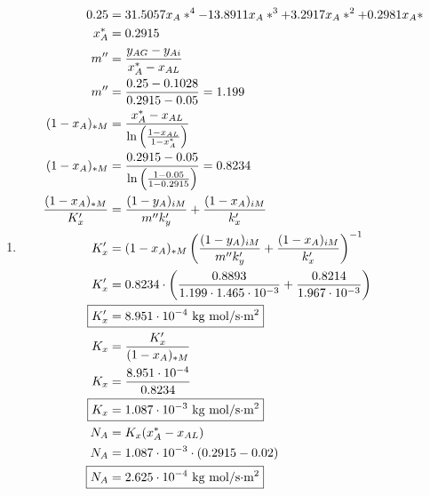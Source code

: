 \documentclass[12pt]{article}
\begin{document}
\begin{enumerate}
\begin{enumerate}
        \item 
        \begin{align*}
            0.25 &= 31.5057 x_A*^4 - 13.8911 x_A*^3 + 3.2917 x_A*^2 + 0.2981 x_A* \\ 
            x_A^* &= 0.2915 \\
            m'' &= \frac{y_{AG} - y_{Ai}}{x_A^* - x_{AL}} \\
            m'' &= \frac{0.25 - 0.1028}{0.2915 - 0.05} = 1.199 \\
            (1 - x_{A})_{*M} &= \frac{x_A^* - x_{AL}}{\ln\left(\frac{1 - x_{AL}}{1 - x_A^*}\right)} \\
            (1 - x_{A})_{*M} &= \frac{0.2915 - 0.05}{\ln\left(\frac{1 - 0.05}{1 - 0.2915}\right)} = 0.8234 \\
            \frac{(1 - x_{A})_{*M}}{K_x'} &= \frac{(1 - y_{A})_{iM}}{m'' k_y'} + \frac{(1 - x_{A})_{iM}}{k_x'} \\
            K_x' &= (1 - x_{A})_{*M} \left(\frac{(1 - y_{A})_{iM}}{m'' k_y'} + \frac{(1 - x_{A})_{iM}}{k_x'}\right)^{-1} \\
            K_x' &= 0.8234 \cdot \left(\frac{0.8893}{1.199 \cdot 1.465 \cdot 10^{-3}} + \frac{0.8214}{1.967 \cdot 10^{-3}}\right) \\
            \Aboxed{K_x' &= 8.951 \cdot 10^{-4} \text{ kg mol/s$\cdot$m$^2$}} \\
            K_x &= \frac{K_x'}{(1 - x_{A})_{*M}} \\
            K_x &= \frac{8.951 \cdot 10^{-4}}{0.8234} \\
            \Aboxed{K_x &= 1.087 \cdot 10^{-3} \text{ kg mol/s$\cdot$m$^2$}} \\
            N_A &= K_x (x_A^* - x_{AL}) \\
            N_A &= 1.087 \cdot 10^{-3} \cdot (0.2915 - 0.02) \\
            \Aboxed{N_A &= 2.625 \cdot 10^{-4} \text{ kg mol/s$\cdot$m$^2$}}
        \end{align*}

    \end{enumerate}


\end{enumerate}
\end{document}
